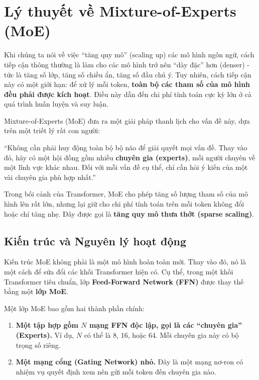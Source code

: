 
\section{Lý thuyết về Mixture-of-Experts (MoE)}
\label{sec:mixture_of_experts}

Khi chúng ta nói về việc “tăng quy mô” (scaling up) các mô hình ngôn ngữ, cách tiếp cận thông thường là làm cho các mô hình trở nên “dày đặc” hơn (denser) - tức là tăng số lớp, tăng số chiều ẩn, tăng số đầu chú ý. Tuy nhiên, cách tiếp cận này có một giới hạn: để xử lý mỗi token, \textbf{toàn bộ các tham số của mô hình đều phải được kích hoạt}. Điều này dẫn đến chi phí tính toán cực kỳ lớn ở cả quá trình huấn luyện và suy luận.

Mixture-of-Experts (MoE) \cite{shazeer2017outrageously, fedus2022switch} đưa ra một giải pháp thanh lịch cho vấn đề này, dựa trên một triết lý rất con người:

\begin{tcolorbox}[
    title=Triết lý của Mixture-of-Experts,
    colback=yellow!10!white, colframe=yellow!50!black, fonttitle=\bfseries
]
“Không cần phải huy động toàn bộ bộ não để giải quyết mọi vấn đề. Thay vào đó, hãy có một hội đồng gồm nhiều \textbf{chuyên gia (experts)}, mỗi người chuyên về một lĩnh vực khác nhau. Đối với mỗi vấn đề cụ thể, chỉ cần hỏi ý kiến của một vài chuyên gia phù hợp nhất.”
\end{tcolorbox}

Trong bối cảnh của Transformer, MoE cho phép tăng số lượng tham số của mô hình lên rất lớn, nhưng lại giữ cho chi phí tính toán trên mỗi token không đổi hoặc chỉ tăng nhẹ. Đây được gọi là \textbf{tăng quy mô thưa thớt (sparse scaling)}.

\subsection{Kiến trúc và Nguyên lý hoạt động}
\label{ssec:moe_architecture}

Kiến trúc MoE không phải là một mô hình hoàn toàn mới. Thay vào đó, nó là một cách để sửa đổi các khối Transformer hiện có. Cụ thể, trong một khối Transformer tiêu chuẩn, lớp \textbf{Feed-Forward Network (FFN)} được thay thế bằng một \textbf{lớp MoE}.

Một lớp MoE bao gồm hai thành phần chính:
\begin{enumerate}
    \item \textbf{Một tập hợp gồm $N$ mạng FFN độc lập, gọi là các “chuyên gia” (Experts).} Ví dụ, $N$ có thể là 8, 16, hoặc 64. Mỗi chuyên gia này có bộ trọng số riêng.
    \item \textbf{Một mạng cổng (Gating Network) nhỏ.} Đây là một mạng nơ-ron có nhiệm vụ quyết định xem nên gửi mỗi token đến chuyên gia nào.
\end{enumerate}

